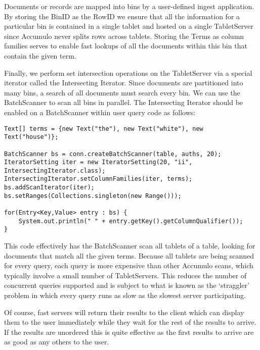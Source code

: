 Documents or records are mapped into bins by a user-defined ingest application. By
storing the BinID as the RowID we ensure that all the information for a particular
bin is contained in a single tablet and hosted on a single TabletServer since
Accumulo never splits rows across tablets. Storing the Terms as column families
serves to enable fast lookups of all the documents within this bin that contain the
given term.

Finally, we perform set intersection operations on the TabletServer via a special
iterator called the Intersecting Iterator. Since documents are partitioned into many
bins, a search of all documents must search every bin. We can use the BatchScanner
to scan all bins in parallel. The Intersecting Iterator should be enabled on a
BatchScanner within user query code as follows:

\small
\begin{verbatim}
Text[] terms = {new Text("the"), new Text("white"), new Text("house")};

BatchScanner bs = conn.createBatchScanner(table, auths, 20);
IteratorSetting iter = new IteratorSetting(20, "ii", IntersectingIterator.class);
IntersectingIterator.setColumnFamilies(iter, terms);
bs.addScanIterator(iter);
bs.setRanges(Collections.singleton(new Range()));

for(Entry<Key,Value> entry : bs) {
    System.out.println(" " + entry.getKey().getColumnQualifier());
}
\end{verbatim}
\normalsize

This code effectively has the BatchScanner scan all tablets of a table, looking for
documents that match all the given terms. Because all tablets are being scanned for
every query, each query is more expensive than other Accumulo scans, which
typically involve a small number of TabletServers. This reduces the number of
concurrent queries supported and is subject to what is known as the `straggler'
problem in which every query runs as slow as the slowest server participating.

Of course, fast servers will return their results to the client which can display them
to the user immediately while they wait for the rest of the results to arrive. If the
results are unordered this is quite effective as the first results to arrive are as good
as any others to the user.


